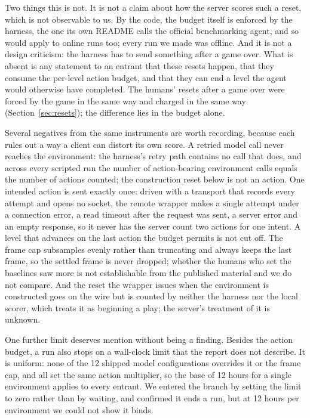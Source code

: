 \documentclass[11pt]{article}
\begin{document}
Two things this is not. It is not a claim about how the server scores such a
reset, which is not observable to us. By the code, the budget itself is
enforced by the harness, the one its own README calls the official benchmarking
agent, and so would apply to online runs too; every run we made was offline. And it is not a design criticism: the harness has to
send something after a game over. What is absent is any statement to an entrant
that these resets happen, that they consume the per-level action budget, and
that they can end a level the agent would otherwise have completed. The humans' resets after a game over were forced by the game in the same way
and charged in the same way (Section~\ref{sec:resets}); the difference lies in
the budget alone.

Several negatives from the same instruments are worth recording, because each
rules out a way a client can distort its own score. A retried model call never
reaches the environment: the harness's retry path contains no call that does,
and across every scripted run the number of action-bearing environment calls
equals the number of actions counted; the construction reset below is not an
action. One intended action is sent exactly once: driven with a
transport that records every attempt and opens no socket, the remote wrapper
makes a single attempt under a connection error, a read timeout after the
request was sent, a server error and an empty response, so it never has the
server count two actions for one intent. A level that advances on the last
action the budget permits is not cut off. The frame cap subsamples evenly rather
than truncating and always keeps the last frame, so the settled frame is never
dropped; whether the humans who set the baselines saw more is not establishable
from the published material and we do not compare. And the reset the wrapper
issues when the environment is constructed goes on the wire but is counted by
neither the harness nor the local scorer, which treats it as beginning a play;
the server's treatment of it is unknown.

One further limit deserves mention without being a finding. Besides the action
budget, a run also stops on a wall-clock limit that the report does not describe.
It is uniform: none of the 12 shipped model configurations overrides it or
the frame cap, and all set the same action multiplier, so the base of 12
hours for a single environment applies to every entrant. We entered the branch
by setting the limit to zero rather than by waiting, and confirmed it ends a run,
but at 12 hours per environment we could not show it binds.
\end{document}
